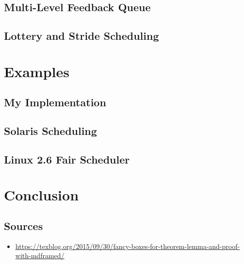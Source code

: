 \documentclass{report}
\begin{document}
\chapter{Multi-Level Feedback Queue}

\chapter{Lottery and Stride Scheduling}

\part{Examples}

\chapter{My Implementation}

\chapter{Solaris Scheduling}

\chapter{Linux 2.6 Fair Scheduler}



\part{Conclusion}

\chapter*{Sources}

\begin{itemize}
    \item \url{https://texblog.org/2015/09/30/fancy-boxes-for-theorem-lemma-and-proof-with-mdframed/}
\end{itemize}
\end{document}
